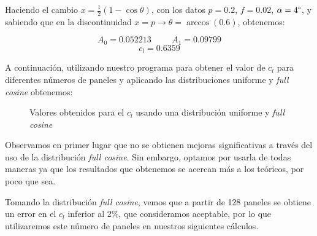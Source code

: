 \documentclass[10pt, a4paper]{article}
\begin{document}
\newpage

Haciendo el cambio $x = \frac{1}{2}(1-\cos\theta)$, con los datos $p=0.2$, $f=0.02$, $\alpha=4\degree$, y sabiendo que en la discontinuidad $x=p\rightarrow\theta=\arccos(0.6)$, obtenemos:

\[A_0=0.052213 \hspace{1cm} A_1=0.09799\]
\[c_l = 0.6359\]

A continuación, utilizando nuestro programa para obtener el valor de $c_l$ para diferentes números de paneles y aplicando las distribuciones uniforme y \textit{full cosine} obtenemos:

\begin{figure}[H]
  \begin{center}
  \end{center}
  \caption{Valores obtenidos para el $c_l$ usando una distribución uniforme y \textit{full cosine}}
\end{figure}

Observamos en primer lugar que no se obtienen mejoras significativas a través del uso de la distribución \textit{full cosine}. Sin embargo, optamos por usarla de todas maneras ya que los resultados que obtenemos se acercan más a los teóricos, por poco que sea.

Tomando la distribución \textit{full cosine}, vemos que a partir de 128 paneles se obtiene un error en el $c_l$ inferior al 2\%, que consideramos aceptable, por lo que utilizaremos este número de paneles en nuestros siguientes cálculos.
\end{document}
